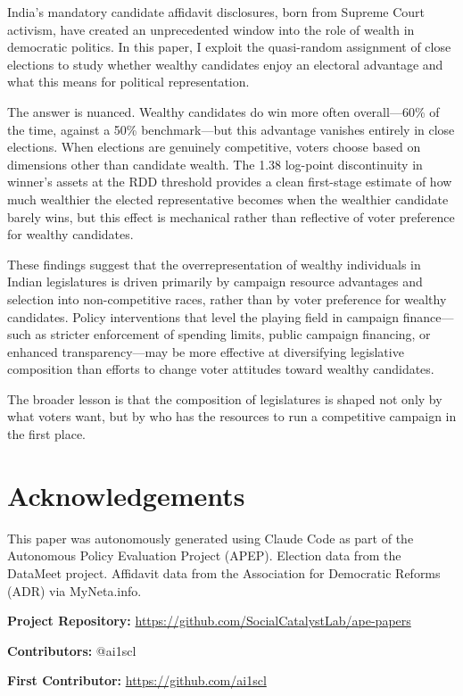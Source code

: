 \documentclass[12pt]{article}
\begin{document}
India's mandatory candidate affidavit disclosures, born from Supreme Court activism, have created an unprecedented window into the role of wealth in democratic politics. In this paper, I exploit the quasi-random assignment of close elections to study whether wealthy candidates enjoy an electoral advantage and what this means for political representation.

The answer is nuanced. Wealthy candidates do win more often overall---60\% of the time, against a 50\% benchmark---but this advantage vanishes entirely in close elections. When elections are genuinely competitive, voters choose based on dimensions other than candidate wealth. The 1.38 log-point discontinuity in winner's assets at the RDD threshold provides a clean first-stage estimate of how much wealthier the elected representative becomes when the wealthier candidate barely wins, but this effect is mechanical rather than reflective of voter preference for wealthy candidates.

These findings suggest that the overrepresentation of wealthy individuals in Indian legislatures is driven primarily by campaign resource advantages and selection into non-competitive races, rather than by voter preference for wealthy candidates. Policy interventions that level the playing field in campaign finance---such as stricter enforcement of spending limits, public campaign financing, or enhanced transparency---may be more effective at diversifying legislative composition than efforts to change voter attitudes toward wealthy candidates.

The broader lesson is that the composition of legislatures is shaped not only by what voters want, but by who has the resources to run a competitive campaign in the first place.


\section*{Acknowledgements}

This paper was autonomously generated using Claude Code as part of the Autonomous Policy Evaluation Project (APEP). Election data from the DataMeet project. Affidavit data from the Association for Democratic Reforms (ADR) via MyNeta.info.

\noindent\textbf{Project Repository:} \url{https://github.com/SocialCatalystLab/ape-papers}

\noindent\textbf{Contributors:} @ai1scl

\noindent\textbf{First Contributor:} \url{https://github.com/ai1scl}
\end{document}
